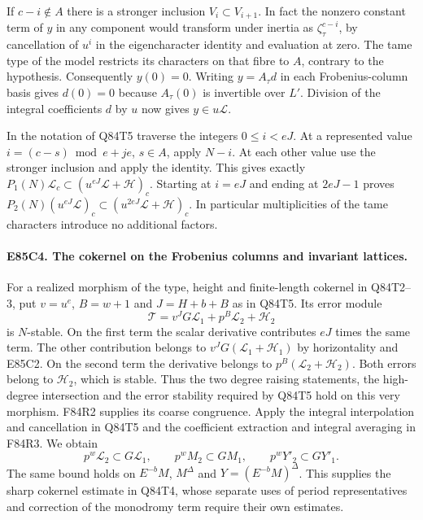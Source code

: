 If $c-i\notin A$ there is a stronger inclusion $V_i\subset V_{i+1}$.
In fact the nonzero constant term of $y$ in any component would
transform under inertia as $\zeta_\tau^{c-i}$, by cancellation of
$u^i$ in the eigencharacter identity and evaluation at zero.
The tame type of the model restricts its characters on that
fibre to $A$, contrary to the hypothesis. Consequently $y(0)=0$.
Writing $y=A_\tau d$ in each Frobenius-column basis gives $d(0)=0$
because $A_\tau(0)$ is invertible over $L'$. Division of the
integral coefficients $d$ by $u$ now gives $y\in u\mathcal L$.

In the notation of Q84T5 traverse the integers $0\le i<eJ$.
At a represented value $i=(c-s)\bmod e+je$, $s\in A$, apply $N-i$.
At each other value use the stronger inclusion and apply the identity.
This gives exactly $P_1(N)\mathcal L_c\subset
(u^{eJ}\mathcal L+\mathcal H)_c$. Starting at $i=eJ$ and ending at
$2eJ-1$ proves $P_2(N)(u^{eJ}\mathcal L)_c\subset
(u^{2eJ}\mathcal L+\mathcal H)_c$. In particular multiplicities of
the tame characters introduce no additional factors.

\paragraph{E85C4. The cokernel on the Frobenius columns and invariant lattices.}
For a realized morphism of the type, height and finite-length
cokernel in Q84T2--3, put $v=u^e$, $B=w+1$ and $J=H+b+B$ as in
Q84T5. Its error module
\[
 \mathcal T=v^JG\mathcal L_1+p^B\mathcal L_2+\mathcal H_2
\]
is $N$-stable. On the first term the scalar derivative contributes
$eJ$ times the same term. The other contribution belongs to
$v^JG(\mathcal L_1+\mathcal H_1)$ by horizontality and E85C2.
On the second term the derivative belongs to
$p^B(\mathcal L_2+\mathcal H_2)$. Both errors belong to
$\mathcal H_2$, which is stable. Thus the two degree raising
statements, the high-degree intersection and the error stability
required by Q84T5 hold on this very morphism. F84R2 supplies its
coarse congruence. Apply the integral interpolation and cancellation
in Q84T5 and the coefficient extraction and integral averaging in
F84R3. We obtain
\[
 p^w\mathcal L_2\subset G\mathcal L_1,\qquad
 p^w M_2\subset GM_1,\qquad p^wY'_2\subset GY'_1 .
\]
The same bound holds on $E^{-b}M$, $M^\Delta$ and
$Y=(E^{-b}M)^\Delta$. This supplies the sharp cokernel estimate in
Q84T4, whose separate uses of period representatives and correction
of the monodromy term require their own estimates.
